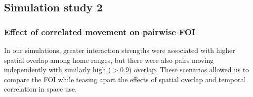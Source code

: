 \documentclass[letterpaper]{article}
\begin{document}






\subsection*{Simulation study 2}

\subsubsection*{Effect of correlated movement on pairwise FOI}

In our simulations, greater interaction strengths were associated with higher spatial overlap among home ranges, but there were also pairs moving independently with similarly high  ($>$0.9) overlap. 
These scenarios allowed us to compare the FOI while teasing apart the effects of spatial overlap and temporal correlation in space use. 
\end{document}
